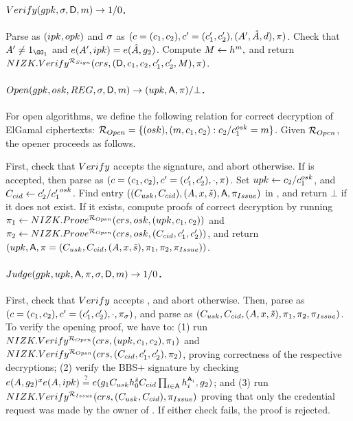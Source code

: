 \paragraph{$Verify(gpk,\sigma,\mathsf{D},m) \rightarrow 1/0$.} %
Parse \gpk as $(ipk,opk)$ and $\sigma$ as $(c=(c_1,c_2),c'=(c'_1,c'_2),
(A',\hat{A},d), \pi)$. Check that $A' \neq 1_{\GG_1}$ and $e(A',ipk) =
e(\hat{A},g_2)$. Compute $M \gets h^m,$ and return
$NIZK.Verify^{\mathcal{R}_{Sign}}(crs,(\mathsf{D},c_1,c_2,c'_1,c'_2,M),
\pi)$.

\paragraph{$\Open(\gpk,\osk,\trans,\sig,\DAttrs,\msg)
  \rightarrow (\upk,\Attrs,\oproof)/\bot$.} %
For open algorithms, we define the following relation for correct decryption of
ElGamal ciphertexts: $\mathcal{R}_{Open} = \lbrace (osk),(m,c_1,c_2):
c_2/c_1^{osk} = m \rbrace$. Given $\mathcal{R}_{Open}$, the opener proceeds as
follows.

First, check that $Verify$ accepts the signature, and abort otherwise. If \sig
is accepted, then parse \sig as $(c=(c_1,c_2),c'=(c'_1,c'_2),\cdot,\pi)$.
Set $upk \gets c_2/c_1^{osk}$, and $C_{cid} \gets c'_2/{c'_1}^{osk}$. Find
entry $((C_{usk},C_{cid}),(A,x,\tilde{s}),\mathsf{A},\pi_{Issue})$ in \trans,
and return $\bot$ if it does not exist. If it exists, compute proofs of correct
decryption
by running $\pi_1 \gets NIZK.Prove^{\mathcal{R}_{Open}}(crs,osk,
(upk,c_1,c_2))$ and $\pi_2 \gets NIZK.Prove^{\mathcal{R}_{Open}}(crs,
osk,(C_{cid},c'_1,c'_2))$, and return $(upk,\mathsf{A},\pi = (C_{usk},
C_{cid},(A,x,\tilde{s}),\pi_1,\pi_2,\pi_{Issue}))$.

\paragraph{$Judge(gpk,upk,\mathsf{A},\pi,\sigma,\mathsf{D},m)
  \rightarrow 1/0$.} %
First, check that $Verify$ accepts \sig, and abort otherwise. Then, parse
\sig as $(c=(c_1,c_2),c'=(c'_1,c'_2),\cdot,\pi_\sigma)$, and parse \oproof
as $(C_{usk},C_{cid},(A,x,\tilde{s}),\pi_1,\pi_2,
\pi_{Issue})$. To verify
the opening proof, we have to: (1) run $NIZK.Verify^{\mathcal{R}_{Open}}(crs,
(upk,c_1,c_2),\pi_1)$ and $NIZK.Verify^{\mathcal{R}_{Open}}(crs,
(C_{cid},c'_1,c'_2),\pi_2)$, proving correctness of the respective
decryptions; (2) verify the BBS+ signature by checking $e(A,g_2)^x
e(A,ipk) \stackrel{?}{=} e(g_1C_{usk}h_0^{\tilde{s}}C_{cid}
\prod_{i \in \mathsf{A}}h_i^{\mathsf{A}_i},g_2)$; and (3) run
$NIZK.Verify^{\mathcal{R}_{Issue}}(crs,(C_{usk},C_{cid}),\pi_{Issue})$
proving that only the credential request was made by the owner of \usk. If
either check fails, the proof is rejected.

